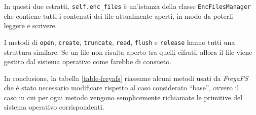 \documentclass[a4paper,12pt,twoside,openright]{report}
\begin{document}
  In questi due estratti, \texttt{self.enc\_files} è un'istanza della classe \texttt{EncFilesManager} che contiene
  tutti i contenuti dei file attualmente aperti, in modo da poterli leggere e scrivere.

  I metodi di \texttt{open}, \texttt{create}, \texttt{truncate}, \texttt{read}, \texttt{flush} e \texttt{release}
  hanno tutti una struttura similare. Se un file non risulta aperto tra quelli cifrati, allora il file viene
  gestito dal sistema operativo come farebbe di consueto.

  In conclusione, la tabella \ref{table-freyafs} riassume alcuni metodi usati da \textit{FreyaFS} che è stato
  necessario modificare rispetto al caso considerato ``base'', ovvero il caso in cui per ogni metodo vengono
  semplicemente richiamate le primitive del sistema operativo corrispondenti.
\end{document}
